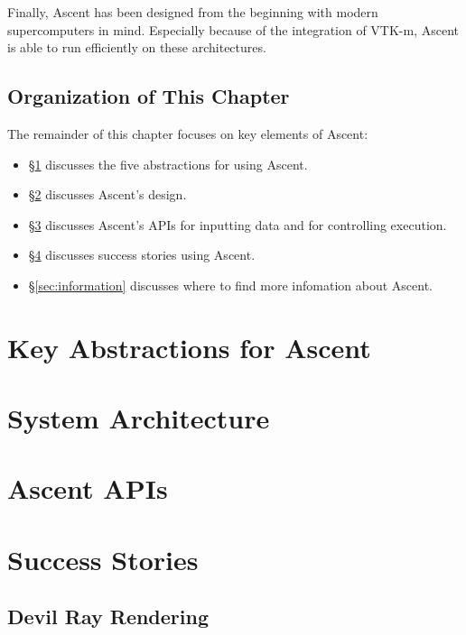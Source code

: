 \documentclass[graybox]{svmult}
\begin{document}
Finally, Ascent has been designed from the beginning with modern
supercomputers in mind.
%
Especially because of the integration of VTK-m, Ascent is able to
run efficiently on these architectures.

\subsection{Organization of This Chapter}

The remainder of this chapter focuses on key elements of Ascent:
\begin{itemize}
\item \S\ref{sec:capabilities} discusses the five abstractions for using Ascent.
\item \S\ref{sec:design} discusses Ascent's design.
\item \S\ref{sec:API} discusses Ascent's APIs for inputting
data and for controlling execution.
\item \S\ref{sec:success} discusses success stories using Ascent.
\item \S\ref{sec:information} discusses where to find more infomation about Ascent.
\end{itemize}

\section{Key Abstractions for Ascent}
\label{sec:capabilities}


\section{System Architecture}
\label{sec:design}


\section{Ascent APIs}
\label{sec:API}


\section{Success Stories}
\label{sec:success}


\subsection{Devil Ray Rendering}
\label{sec:DevilRay}

\end{document}
